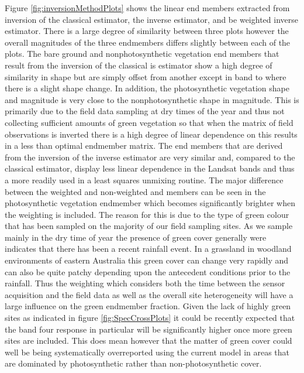\documentclass[remotesensing,article,accept,moreauthors,pdftex,12pt,a4paper]{mdpi}
\begin{document}
Figure \ref{fig:inversionMethodPlots} shows the linear end members extracted from inversion of the classical estimator, the inverse estimator, and be weighted inverse estimator. There is a large degree of similarity between three plots however the overall magnitudes of the three endmembers differs slightly between each of the plots. The bare ground and nonphotosynthetic vegetation end members that result from the inversion of the classical is estimator show a high degree of similarity in shape but are simply offset from another except in band to where there is a slight shape change. In addition, the photosynthetic vegetation shape and magnitude is very close to the nonphotosynthetic shape in magnitude. This is primarily due to the field data sampling at dry times of the year and thus not collecting sufficient amounts of green vegetation so that when the matrix of field observations is inverted there is a high degree of linear dependence on this results in a less than optimal endmember matrix. 
The end members that are derived from the inversion of the inverse estimator are very similar and, compared to the classical estimator, display less linear dependence in the Landsat bands and thus a more readily used in a least squares unmixing routine. The major difference between the weighted and non-weighted and members can be seen in the photosynthetic vegetation endmember which becomes significantly brighter when the weighting is included. The reason for this is due to the type of green colour that has been sampled on the majority of our field sampling sites. As we sample mainly in the dry time of year the presence of green cover generally were indicates that there has been a recent rainfall event. In a grassland in woodland environments of eastern Australia this green cover can change very rapidly and can also be quite patchy depending upon the antecedent conditions prior to the rainfall. Thus the weighting which considers both the time between the sensor acquisition and the field data as well as the overall site heterogeneity will have a large influence on the green endmember fraction. Given the lack of highly green sites as indicated in figure \ref{fig:SpecCrossPlots} it could be recently expected that the band four response in particular will be significantly higher once more green sites are included. This does mean however that the matter of green cover could well be being systematically overreported using the current model in areas that are dominated by photosynthetic rather than non-photosynthetic cover.
\end{document}
